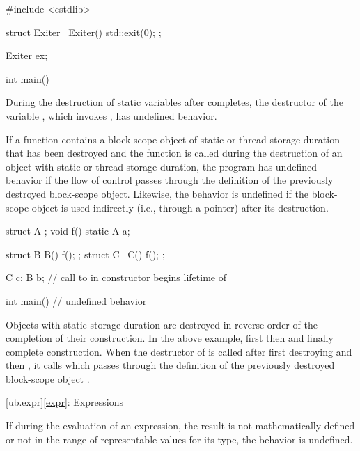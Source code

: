 \pnum
\begin{example}
\begin{codeblock}
#include <cstdlib>

struct Exiter {
  ~Exiter() { std::exit(0); }
};

Exiter ex;

int main() {}
\end{codeblock}
During the destruction
of static variables
after  completes,
the destructor of the variable ,
which invokes ,
has undefined behavior.
\end{example}


\pnum
If a function contains a block-scope object of static
or thread storage duration that has been destroyed
and the function is called
during the destruction of an object with static or thread storage duration,
the program has undefined behavior if the flow of control
passes through the definition of the previously destroyed block-scope object.
Likewise, the behavior is undefined if the block-scope object
is used indirectly (i.e., through a pointer) after its destruction.

\pnum
\begin{example}
\begin{codeblock}
struct A {};
void f() {
  static A a;
}

struct B {
  B() { f(); }
};
struct C {
  ~C() { f(); }
};

C c;
B b;    // call to  in constructor begins lifetime of 

int main() {}   // undefined behavior
\end{codeblock}
Objects with static storage duration
are destroyed in reverse order
of the completion
of their construction.
In the above example,
first  then  and finally 
complete construction.
When the destructor of  is called
after first destroying  and then ,
it calls  which
passes through the definition of
the previously destroyed
block-scope object .
\end{example}

[ub.expr]{\ref*{expr}: Expressions}


\pnum
If during the evaluation of an expression,
the result is not mathematically defined
or not in the range of representable values for its type,
the behavior is undefined.

